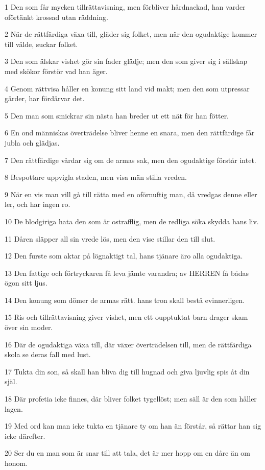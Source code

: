 \par 1 Den som får mycken tillrättavisning, men förbliver hårdnackad, han varder oförtänkt krossad utan räddning.
\par 2 När de rättfärdiga växa till, gläder sig folket, men när den ogudaktige kommer till välde, suckar folket.
\par 3 Den som älskar vishet gör sin fader glädje; men den som giver sig i sällskap med skökor förstör vad han äger.
\par 4 Genom rättvisa håller en konung sitt land vid makt; men den som utpressar gärder, har fördärvar det.
\par 5 Den man som smickrar sin nästa han breder ut ett nät för han fötter.
\par 6 En ond människas överträdelse bliver henne en snara, men den rättfärdige får jubla och glädjas.
\par 7 Den rättfärdige vårdar sig om de armas sak, men den ogudaktige förstår intet.
\par 8 Bespottare uppvigla staden, men visa män stilla vreden.
\par 9 När en vis man vill gå till rätta med en oförnuftig man, då vredgas denne eller ler, och har ingen ro.
\par 10 De blodgiriga hata den som är ostrafflig, men de redliga söka skydda hans liv.
\par 11 Dåren släpper all sin vrede lös, men den vise stillar den till slut.
\par 12 Den furste som aktar på lögnaktigt tal, hans tjänare äro alla ogudaktiga.
\par 13 Den fattige och förtryckaren få leva jämte varandra; av HERREN få bådas ögon sitt ljus.
\par 14 Den konung som dömer de armas rätt. hans tron skall bestå evinnerligen.
\par 15 Ris och tillrättavisning giver vishet, men ett oupptuktat barn drager skam över sin moder.
\par 16 Där de ogudaktiga växa till, där växer överträdelsen till, men de rättfärdiga skola se deras fall med lust.
\par 17 Tukta din son, så skall han bliva dig till hugnad och giva ljuvlig spis åt din själ.
\par 18 Där profetia icke finnes, där bliver folket tygellöst; men säll är den som håller lagen.
\par 19 Med ord kan man icke tukta en tjänare ty om han än förstår, så rättar han sig icke därefter.
\par 20 Ser du en man som är snar till att tala, det är mer hopp om en dåre än om honom.
